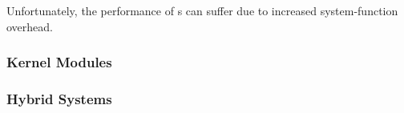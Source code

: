 Unfortunately, the performance of s can suffer due to increased system-function overhead.

\subsubsection{Kernel Modules}\label{subsubsec:Kernel_Modules}
\subsubsection{Hybrid Systems}\label{subsubsec:Hybrid_Systems}

